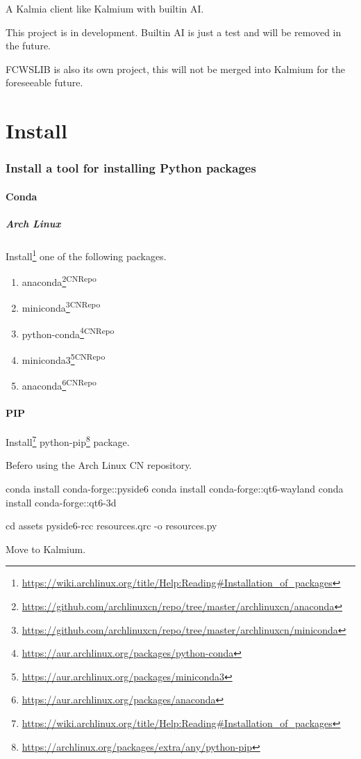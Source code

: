 \documentclass{article}
\begin{document}
	A Kalmia client like Kalmium with builtin AI.
	
	This project is in development. Builtin AI is just a test and will be removed in the future. 
	
	FCWSLIB is also its own project, this will not be merged into Kalmium for the foreseeable future.
	
	\part{Install}
	
	\section{Install a tool for installing Python packages}
	
	\subsection{Conda}
	
	\subsubsection{Arch Linux}
	
	Install\footnote{\url{https://wiki.archlinux.org/title/Help:Reading\#Installation\_of\_packages}} one of the following packages.
	
	\begin{enumerate}
		\item anaconda\footnote{\url{https://github.com/archlinuxcn/repo/tree/master/archlinuxcn/anaconda}}\textsuperscript{CNRepo}
		\item miniconda\footnote{\url{https://github.com/archlinuxcn/repo/tree/master/archlinuxcn/miniconda}}\textsuperscript{CNRepo}
		\item python-conda\footnote{\url{https://aur.archlinux.org/packages/python-conda}}\textsuperscript{CNRepo}
		\item miniconda3\footnote{\url{https://aur.archlinux.org/packages/miniconda3}}\textsuperscript{CNRepo}
		\item anaconda\footnote{\url{https://aur.archlinux.org/packages/anaconda}}\textsuperscript{CNRepo}
	\end{enumerate}
	
	\subsection{PIP}
	
	Install\footnote{\url{https://wiki.archlinux.org/title/Help:Reading\#Installation\_of\_packages}} python-pip\footnote{\url{https://archlinux.org/packages/extra/any/python-pip}} package.
	
	Befero using the Arch Linux CN repository.
	
	conda install conda-forge::pyside6
	conda install conda-forge::qt6-wayland
	conda install conda-forge::qt6-3d

	cd assets
	pyside6-rcc resources.qrc -o resources.py
	
	Move to Kalmium.
	
\end{document}
